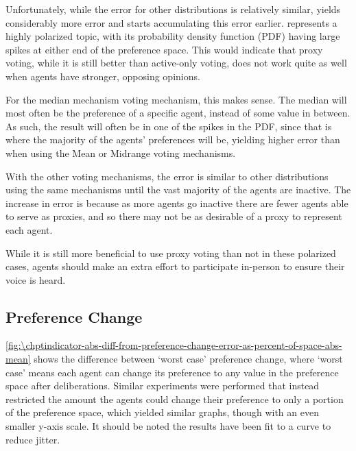 Unfortunately, while the error for other distributions is relatively similar,
 yields considerably more error and starts accumulating
this error earlier.
 represents a highly polarized topic, with its probability
density function (PDF) having large spikes at either end of the preference space.
This would indicate that proxy voting, while it is still better than active-only
voting, does not work quite as well when agents have stronger, opposing opinions.

For the median mechanism voting mechanism, this makes sense.
The median will most often be the preference of a specific agent, instead of some
value in between.
As such, the result will often be in one of the spikes in the PDF, since that is
where the majority of the agents' preferences will be, yielding higher error than when
using the Mean or Midrange voting mechanisms.

With the other voting mechanisms, the error is similar to other distributions using
the same mechanisms until the vast majority of the agents are inactive.
The increase in error is because as more agents go inactive there are fewer agents able
to serve as proxies, and so there may not be as desirable of a proxy to represent
each agent.

While it is still more beneficial to use proxy voting than not in these polarized
cases, agents should make an extra effort to participate in-person to ensure their
voice is heard.

\subsection{Preference Change}\label{subsec:\chptindicator-results-shift}
\autoref{fig:\chptindicator-abs-diff-from-preference-change-error-as-percent-of-space-abs-mean} shows
the difference between `worst case' preference change, where `worst case' means each
agent can change its preference to any value in the preference space after
deliberations.
Similar experiments were performed that instead restricted the amount the agents
could change their preference to only a portion of the preference space, which
yielded similar graphs, though with an even smaller y-axis scale.
It should be noted the results have been fit to a curve to reduce jitter.

